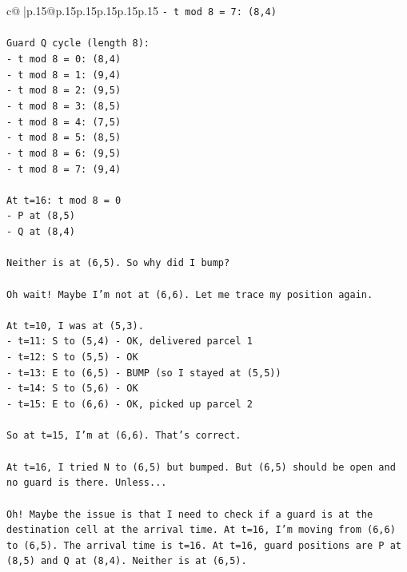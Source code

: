 \documentclass{article}
\begin{document}
{\begin{supertabular}{c@{$\;$}|p{.15\linewidth}@{}p{.15\linewidth}p{.15\linewidth}p{.15\linewidth}p{.15\linewidth}p{.15\linewidth}}
{{{\texttt{{-} t mod 8 = 7: (8,4)} \\
\\ 
\texttt{Guard Q cycle (length 8):} \\
\texttt{{-} t mod 8 = 0: (8,4)} \\
\texttt{{-} t mod 8 = 1: (9,4)} \\
\texttt{{-} t mod 8 = 2: (9,5)} \\
\texttt{{-} t mod 8 = 3: (8,5)} \\
\texttt{{-} t mod 8 = 4: (7,5)} \\
\texttt{{-} t mod 8 = 5: (8,5)} \\
\texttt{{-} t mod 8 = 6: (9,5)} \\
\texttt{{-} t mod 8 = 7: (9,4)} \\
\\ 
\texttt{At t=16: t mod 8 = 0} \\
\texttt{{-} P at (8,5)} \\
\texttt{{-} Q at (8,4)} \\
\\ 
\texttt{Neither is at (6,5). So why did I bump?} \\
\\ 
\texttt{Oh wait! Maybe I'm not at (6,6). Let me trace my position again.} \\
\\ 
\texttt{At t=10, I was at (5,3).} \\
\texttt{{-} t=11: S to (5,4) {-} OK, delivered parcel 1} \\
\texttt{{-} t=12: S to (5,5) {-} OK} \\
\texttt{{-} t=13: E to (6,5) {-} BUMP (so I stayed at (5,5))} \\
\texttt{{-} t=14: S to (5,6) {-} OK} \\
\texttt{{-} t=15: E to (6,6) {-} OK, picked up parcel 2} \\
\\ 
\texttt{So at t=15, I'm at (6,6). That's correct.} \\
\\ 
\texttt{At t=16, I tried N to (6,5) but bumped. But (6,5) should be open and no guard is there. Unless...} \\
\\ 
\texttt{Oh! Maybe the issue is that I need to check if a guard is at the destination cell at the arrival time. At t=16, I'm moving from (6,6) to (6,5). The arrival time is t=16. At t=16, guard positions are P at (8,5) and Q at (8,4). Neither is at (6,5).} \\
}}}
\end{supertabular}}
\end{document}

